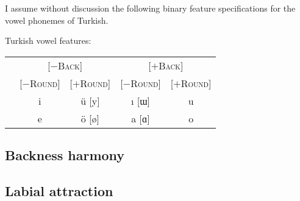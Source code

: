 
\citet{Zimmer1969}

I assume without discussion the following binary feature specifications for the vowel phonemes of Turkish.

\ex Turkish vowel features: \vspace{6pt} \\
\begin{tabular}{c | c c c c}
                       & \multicolumn{2}{c}{[$-$\textsc{Back}]} & \multicolumn{2}{c}{[$+$\textsc{Back}]} \\
                       & [$-$\textsc{Round}] & [$+$\textsc{Round}] & [$-$\textsc{Round}] & [$+$\textsc{Round}] \\ \midrule
{} & i & ü [y] & ı [ɯ] & u \\
 & e & ö [ø] & a [ɑ] & o \\
\end{tabular}
\xe


\subsection{Backness harmony}  
\subsection{Labial attraction} 

